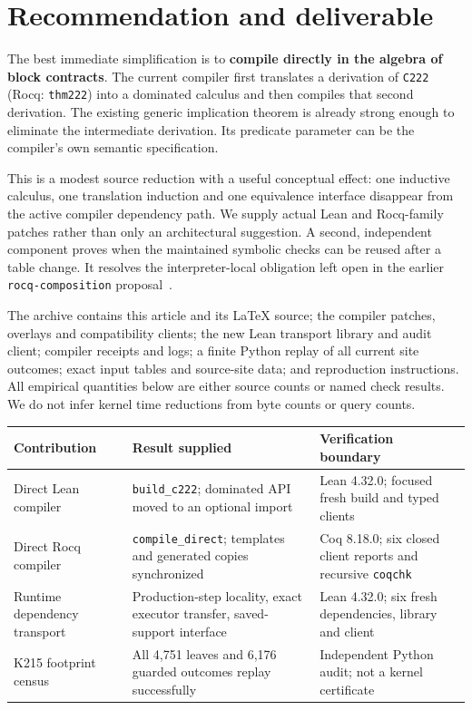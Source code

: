 \documentclass[11pt]{article}
\theoremstyle{definition}\newtheorem{definition}[theorem]{Definition}
\newcommand{\code}[1]{\texttt{#1}}
\begin{document}
{\small\setlength{\parskip}{0pt}\tableofcontents}
\newpage

\section{Recommendation and deliverable}

The best immediate simplification is to \textbf{compile directly in the algebra
of block contracts}. The current compiler first translates a derivation of
\code{C222} (Rocq: \code{thm222}) into a dominated calculus and then compiles that
second derivation. The existing generic implication theorem is already strong
enough to eliminate the intermediate derivation. Its predicate parameter can be
the compiler's own semantic specification.

This is a modest source reduction with a useful conceptual effect: one inductive
calculus, one translation induction and one equivalence interface disappear from
the active compiler dependency path. We supply actual Lean and Rocq-family
patches rather than only an architectural suggestion. A second, independent
component proves when the maintained symbolic checks can be reused after a
table change. It resolves the interpreter-local obligation left open in the
earlier \code{rocq-composition} proposal~\cite{priortransport}.

The archive contains this article and its LaTeX source; the compiler patches,
overlays and compatibility clients; the new Lean transport library and audit
client; compiler receipts and logs; a finite Python replay of all current site
outcomes; exact input tables and source-site data; and reproduction instructions.
All empirical quantities below are either source counts or named check results.
We do not infer kernel time reductions from byte counts or query counts.

\begin{table}[h]
\centering\small
\begin{tabularx}{\textwidth}{@{}p{}X p{}@{}}
\toprule
Contribution & Result supplied & Verification boundary\\
\midrule
Direct Lean compiler & \code{build\_c222}; dominated API moved to an optional import & Lean 4.32.0; focused fresh build and typed clients\\
Direct Rocq compiler & \code{compile\_direct}; templates and generated copies synchronized & Coq 8.18.0; six closed client reports and recursive \code{coqchk}\\
Runtime dependency transport & Production-step locality, exact executor transfer, saved-support interface & Lean 4.32.0; six fresh dependencies, library and client\\
K215 footprint census & All 4,751 leaves and 6,176 guarded outcomes replay successfully & Independent Python audit; not a kernel certificate\\
\bottomrule
\end{tabularx}
\end{table}
\end{document}
